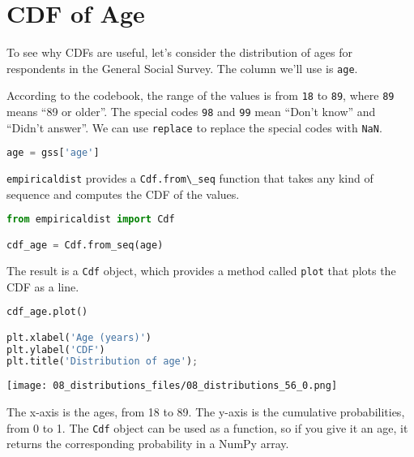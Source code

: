 \section{CDF of Age}\label{cdf-of-age}

To see why CDFs are useful, let's consider the distribution of ages for
respondents in the General Social Survey. The column we'll use is
\passthrough{\lstinline!age!}.

According to the codebook, the range of the values is from
\passthrough{\lstinline!18!} to \passthrough{\lstinline!89!}, where
\passthrough{\lstinline!89!} means ``89 or older''. The special codes
\passthrough{\lstinline!98!} and \passthrough{\lstinline!99!} mean
``Don't know'' and ``Didn't answer''. We can use
\passthrough{\lstinline!replace!} to replace the special codes with
\passthrough{\lstinline!NaN!}.

\begin{lstlisting}[language=Python,style=source]
age = gss['age']
\end{lstlisting}

\passthrough{\lstinline!empiricaldist!} provides a
\passthrough{\lstinline!Cdf.from\_seq!} function that takes any kind of
sequence and computes the CDF of the values.

\begin{lstlisting}[language=Python,style=source]
from empiricaldist import Cdf

cdf_age = Cdf.from_seq(age)
\end{lstlisting}

The result is a \passthrough{\lstinline!Cdf!} object, which provides a
method called \passthrough{\lstinline!plot!} that plots the CDF as a
line.

\begin{lstlisting}[language=Python,style=source]
cdf_age.plot()

plt.xlabel('Age (years)')
plt.ylabel('CDF')
plt.title('Distribution of age');
\end{lstlisting}

\begin{center}
\texttt{[image: 08\_distributions\_files/08\_distributions\_56\_0.png]}
\end{center}

The x-axis is the ages, from 18 to 89. The y-axis is the cumulative
probabilities, from 0 to 1. The \passthrough{\lstinline!Cdf!} object can
be used as a function, so if you give it an age, it returns the
corresponding probability in a NumPy array.

